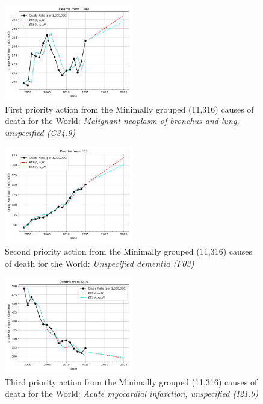 \documentclass[10pt, a4paper, twocolumn]{IEEEconf}
\begin{document}
\begin{figure}[H]
  \centering
  \includegraphics[width=0.5\textwidth]{results/WORLD_ICD10_MINIMALLY_GROUPED/C349_ets.png}
  \caption{First priority action from the Minimally grouped (11,316) causes of death for the World: \textit{Malignant neoplasm of bronchus and lung, unspecified (C34.9)}}\label{fig:k8a}
\end{figure}

\begin{figure}[H]
  \centering
  \includegraphics[width=0.5\textwidth]{results/WORLD_ICD10_MINIMALLY_GROUPED/F03_ets.png}
  \caption{Second priority action from the Minimally grouped (11,316) causes of death for the World: \textit{Unspecified dementia (F03)}}\label{fig:k8b}
\end{figure}

\begin{figure}[H]
  \centering
  \includegraphics[width=0.5\textwidth]{results/WORLD_ICD10_MINIMALLY_GROUPED/I219_ets.png}
  \caption{Third priority action from the Minimally grouped (11,316) causes of death for the World: \textit{Acute myocardial infarction, unspecified (I21.9)}}\label{fig:k8c}
\end{figure}
\end{document}

